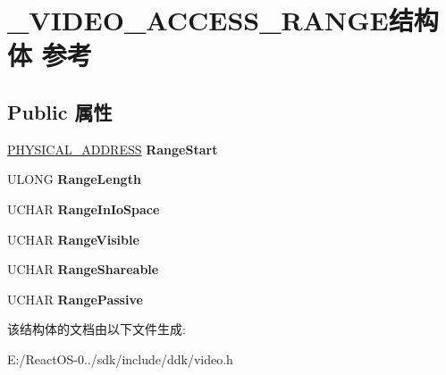 \hypertarget{struct___v_i_d_e_o___a_c_c_e_s_s___r_a_n_g_e}{}\section{\+\_\+\+V\+I\+D\+E\+O\+\_\+\+A\+C\+C\+E\+S\+S\+\_\+\+R\+A\+N\+G\+E结构体 参考}
\label{struct___v_i_d_e_o___a_c_c_e_s_s___r_a_n_g_e}
\subsection*{Public 属性}
\begin{DoxyCompactItemize}
\item 
\mbox{\label{struct___v_i_d_e_o___a_c_c_e_s_s___r_a_n_g_e_a9ba70f107886d2a740d40078a183e576}} 
\hyperlink{union___l_a_r_g_e___i_n_t_e_g_e_r}{P\+H\+Y\+S\+I\+C\+A\+L\+\_\+\+A\+D\+D\+R\+E\+SS} {\bfseries Range\+Start}
\item 
\mbox{\label{struct___v_i_d_e_o___a_c_c_e_s_s___r_a_n_g_e_a1b32548757cbe3676c4886d50da6d92e}} 
U\+L\+O\+NG {\bfseries Range\+Length}
\item 
\mbox{\label{struct___v_i_d_e_o___a_c_c_e_s_s___r_a_n_g_e_a1eab070e8bce000dcf085d8adf0442ed}} 
U\+C\+H\+AR {\bfseries Range\+In\+Io\+Space}
\item 
\mbox{\label{struct___v_i_d_e_o___a_c_c_e_s_s___r_a_n_g_e_a0d5d2f541814b7a90b3e5484d22c24f0}} 
U\+C\+H\+AR {\bfseries Range\+Visible}
\item 
\mbox{\label{struct___v_i_d_e_o___a_c_c_e_s_s___r_a_n_g_e_a24ed9dc5d4d1e954d5d02304156025d1}} 
U\+C\+H\+AR {\bfseries Range\+Shareable}
\item 
\mbox{\label{struct___v_i_d_e_o___a_c_c_e_s_s___r_a_n_g_e_ab27ca2e692ba994c0c0e9a69d1be46a7}} 
U\+C\+H\+AR {\bfseries Range\+Passive}
\end{DoxyCompactItemize}


该结构体的文档由以下文件生成\+:\begin{DoxyCompactItemize}
\item 
E\+:/\+React\+O\+S-\/0../sdk/include/ddk/video.\+h\end{DoxyCompactItemize}

